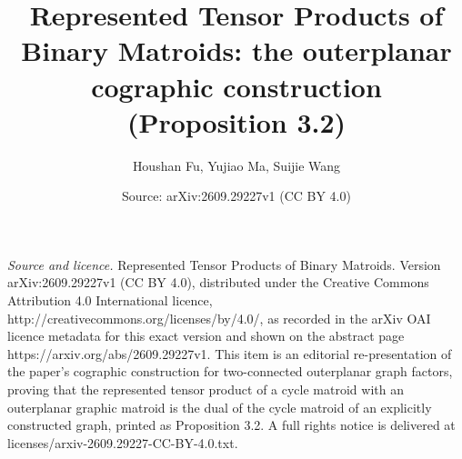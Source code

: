 \documentclass[10pt,a4paper]{amsart}
\title[Represented tensor products of binary matroids]{Represented Tensor Products of Binary Matroids: the outerplanar cographic construction (Proposition 3.2)}
\author[H. Fu, Y. Ma, S. Wang]{Houshan Fu, Yujiao Ma, Suijie Wang}
\date{Source: arXiv:2609.29227v1 (CC BY 4.0)}
\numberwithin{equation}{section}
\theoremstyle{definition}
\theoremstyle{remark}
\begin{document}
\maketitle
\vspace{1em}
\noindent\textit{Source and licence.} Represented Tensor Products of Binary Matroids. Version arXiv:2609.29227v1 (CC BY 4.0), distributed under the Creative Commons Attribution 4.0 International licence, http://creativecommons.org/licenses/by/4.0/, as recorded in the arXiv OAI licence metadata for this exact version and shown on the abstract page https://arxiv.org/abs/2609.29227v1. This item is an editorial re-presentation of the paper's cographic construction for two-connected outerplanar graph factors, proving that the represented tensor product of a cycle matroid with an outerplanar graphic matroid is the dual of the cycle matroid of an explicitly constructed graph, printed as Proposition 3.2. A full rights notice is delivered at licenses/arxiv-2609.29227-CC-BY-4.0.txt.
\end{document}
